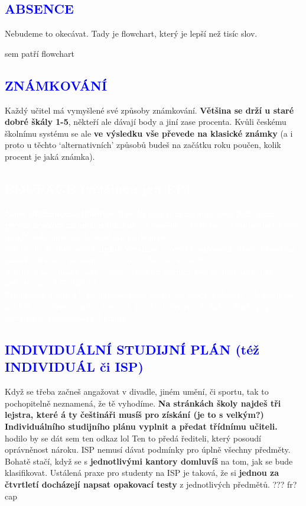 \documentclass{article}
\newcommand{\podnadpisf}[1]{
  \subsection*{\textcolor{blue}{#1}}
}
\begin{document}
\pagebreak
\podnadpisf{ABSENCE}
Nebudeme to okecávat. Tady je flowchart, který je lepší než tisíc slov.

sem patří flowchart

\pagebreak

\podnadpisf{ZNÁMKOVÁNÍ}
Každý učitel má vymyšlené své způsoby známkování. \textbf{Většina se drží u staré dobré škály 1-5}, někteří ale dávají body a jiní zase procenta. Kvůli českému školnímu systému se ale \textbf{ve výsledku vše převede na klasické známky} (a i proto u těchto ‘alternativních’ způsobů budeš na začátku roku poučen, kolik procent je jaká známka).

\begin{bluebox}
\textcolor{white}{\subsection*{EDUPAGE (většinou jen EP)}
\textbf{Naše elektronická třídnice.} Zavedli jsme ji na začátku roku 2020, takže \textbf{prošla doslova zkouškou ohněm} -- a úspěšně (i když to je diskutabilní). Občas na EP nadáváme, ale to snad ani
nejde jinak. \\
Faktem je, že tam najdeš \textbf{úplně všechno} -- rozvrhy, suplování, úkoly, hlasování, známky, absence, prezentace... a to všechno na kvadrát. \\
A taky si tam můžeš psát s učiteli. Jedna z prvních věcí by tedy mělo být milostné psaní Gábině Chovancové. \\
Přidat rant o tom jak lze naimportovat rozvrh do google kalendáře. Actually to má být v modrém boxíku, toto celé ne. Je to designová chyba. Boxík je pro poznámky či doplňující informace.
}
\end{bluebox}

\podnadpisf{INDIVIDUÁLNÍ STUDIJNÍ PLÁN (též INDIVIDUÁL či ISP)}
Když se třeba začneš angažovat v divadle, jiném umění, či sportu, tak to pochopitelně neznamená, že tě vyhodíme. \textbf{Na stránkách školy najdeš tři lejstra, které á ty češtináři musíš pro získání (je to s velkým?) Individuálního studijního plánu vyplnit a předat třídnímu učiteli.} hodilo by se dát sem ten odkaz lol Ten to předá řediteli, který posoudí oprávněnost nároku.
ISP nemusí dávat podmínky pro úplně všechny předměty. Bohatě stačí, když se
s \textbf{jednotlivými kantory domluvíš} na tom, jak se bude klasifikovat. Ustálená praxe pro studenty na ISP je taková, že si \textbf{jednou za čtvrtletí docházejí napsat opakovací testy} z jednotlivých předmětů. ??? fr? cap
\end{document}
